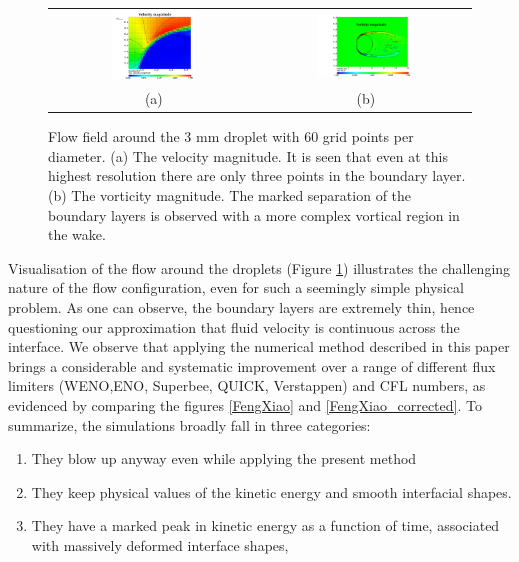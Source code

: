 \begin{figure}[!h]
\begin{center}
\begin{tabular}{cc}
\includegraphics[width=0.42\textwidth]{Figures/vel.png}
& \includegraphics[width=0.48\textwidth]{Figures/vort.png} \\
(a) & (b)
\end{tabular}
\end{center}
\caption{Flow field around the 3 mm droplet with 60 grid points per diameter. 
(a) The velocity magnitude. It is seen that even at this highest resolution 
there are only three points in the boundary layer. (b) The vorticity magnitude. 
The marked separation of the boundary layers is observed with 
a more complex vortical region in the wake.}
\label{magn}
\end{figure}
\newcommand\DDD{{\cal D}}

Visualisation of the flow around the droplets (Figure \ref{magn}) illustrates the challenging nature of the flow configuration, even for such a seemingly simple physical problem. As one can observe, the boundary layers are extremely thin, hence questioning our approximation that fluid velocity is continuous across the interface. We observe that applying the numerical method described in this paper brings a considerable and systematic improvement over a range of different flux limiters (WENO,ENO, Superbee, QUICK, Verstappen) and CFL numbers, as evidenced by comparing the figures \ref{FengXiao} and \ref{FengXiao_corrected}. To summarize, the simulations broadly fall in three categories: 

\begin{enumerate}
	\item They blow up anyway even while applying the present method
	\item They keep physical values of the kinetic energy and smooth interfacial shapes.
	\item They have a marked peak in kinetic energy as a function of time, associated with massively deformed interface shapes, 
\end{enumerate}

